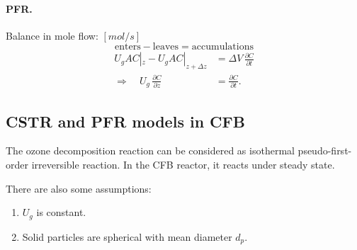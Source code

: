 \paragraph{PFR. }
Balance in mole flow:
$[\si{mol/s}]$
\begin{equation*}
    \mathrm{enters}-\mathrm{leaves}=\mathrm{accumulations}
\end{equation*}
\begin{align}
    U_g A C|_z - U_g A C|_{z+\Delta z}
     & = \Delta V \, \frac{\partial C}{\partial t} \\
    \Longrightarrow \quad
    U_g \, \frac{\partial C}{\partial z}
     & = \frac{\partial C}{\partial t}.
    \label{eq: kinetics - original PFR}
\end{align}

\subsection{CSTR and PFR models in CFB}
The ozone decomposition reaction can be considered as isothermal pseudo-first-order irreversible reaction.
In the CFB reactor, it reacts under steady state.

There are also some assumptions:
\begin{enumerate}
    \item $U_g$ is constant.
    \item Solid particles are spherical with mean diameter $d_p$.
\end{enumerate}

